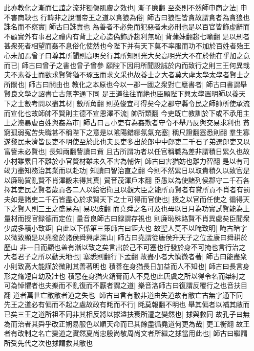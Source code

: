 此亦教化之漸而仁誼之流非獨傷肌膚之效也|{
	漸子廉翻}
至秦則不然師申商之法|{
	申不害商鞅也}
行韓非之說憎帝王之道以貪狼為俗|{
	師古曰狼性皆貪故謂貪者為貪狼也}
誅名而不察實|{
	師古曰誅責也}
為善者不必免而犯惡者未必刑也是以百官皆飾虚辭而不顧實外有事君之禮内有背上之心造偽飾詐趨利無恥|{
	背蒲妹翻趨七喻翻}
是以刑者甚衆死者相望而姦不息俗化使然也今陛下并有天下莫不率服而功不加於百姓者殆王心未加焉曾子曰尊其所聞則高明矣行其所知則光大矣高明光大不在於他在乎加之意而已|{
	師古曰曾子之書也曾子曾參}
願陛下因用所聞設誠於内而致行之則三王何異哉夫不素養士而欲求賢譬猶不琢玉而求文采也故養士之大者莫大虖太學太學者賢士之所關也|{
	師古曰關由也}
教化之本原也今以一郡一國之衆對亡應書者|{
	師古曰書謂舉賢良文學之詔書亡古無字通下同}
是王道往往而絶也臣願陛下興太學置明師以養天下之士數考問以盡其材|{
	數所角翻}
則英俊宜可得矣今之郡守縣令民之師帥所使承流而宣化也故師帥不賢則主德不宣恩澤不流|{
	帥所類翻}
今吏既亡教訓於下或不承用主上之灋暴虐百姓與姦為市|{
	師古曰言小吏有為姦欺者守令不舉乃反與交易求利也}
貧窮孤弱寃苦失職甚不稱陛下之意是以隂陽錯繆氛氣充塞|{
	稱尺證翻塞悉則翻}
羣生寡遂黎民未濟皆長吏不明使至於此也夫長吏多出於郎中中郎吏二千石子弟選郎吏又以富訾未必賢也|{
	長知兩翻訾讀曰貲}
且古所謂功者以任官稱職為差非謂積日累久也故小材雖累日不離於小官賢材雖未久不害為輔佐|{
	師古曰害猶妨也離力智翻}
是以有司竭力盡知務治其業而以赴功|{
	知讀曰智治直之翻}
今則不然累日以取貴積久以致官是以廉恥貿亂賢不肖渾殽未得其真|{
	貿音茂渾戶本翻}
臣愚以為使諸列侯郡守二千石各擇其吏民之賢者歲貢各二人以給宿衛且以觀大臣之能所貢賢者有賞所貢不肖者有罰夫如是諸吏二千石皆盡心於求賢天下之士可得而官使也|{
	授之以官而任使之}
徧得天下之賢人則三王之盛易為|{
	易以豉翻}
而堯舜之名可及也毋以日月為功實試賢能為上量材而授官録德而定位|{
	量音良師古曰録謂存視也}
則廉恥殊路賢不肖異處矣臣聞衆少成多積小致鉅|{
	自此以下係第三策師古曰鉅大也}
故聖人莫不以晻致明|{
	晻古暗字}
以微致顯是以堯發於諸侯舜興虖深山|{
	師古曰堯謂從唐侯升天子之位孟康曰舜耕於歷山}
非一日而顯也盖有漸以致之矣言出於己不可塞也行發於身不可掩也言行治之大者君子之所以動天地也|{
	塞悉則翻行下孟翻}
故盡小者大慎微者著|{
	師古曰能盡衆小則致高大能謹於微則其善著明也}
積善在身猶長日加益而人不知也|{
	師古曰長言身形之脩短自幼及壯也}
積惡在身猶火銷膏而人不見也此唐虞之所以得令名而桀紂之可為悼懼者也夫樂而不亂復而不厭者謂之道|{
	樂音洛師古曰復謂反覆行之也音扶目翻}
道者萬世亡敝敝者道之失也|{
	師古曰言有敝非道由失道故有敝亡古無字通下同}
先王之道必有偏而不起之處故政有眊而不行|{
	眊莫報翻不明也}
舉其偏者以補其敝而已矣三王之道所祖不同非其相反將以捄溢扶衰所遭之變然也|{
	捄與救同}
故孔子曰無為而治者其舜乎改正朔易服色以順天命而已其餘盡循堯道何更為哉|{
	更工衡翻}
故王者有改制之名亡變道之實然夏尚忠殷尚敬周尚文者所繼之捄當用此也|{
	師古曰繼謂所受先代之次也捄謂救其敝也}
